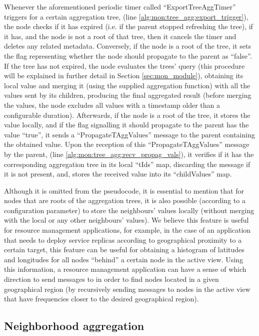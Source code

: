 Whenever the aforementioned periodic timer called ``ExportTreeAggTimer'' triggers for a certain aggregation tree, (line \ref{alg:mon:tree_agg:export_trigger}), the node checks if it has expired (i.e. if the parent stopped refreshing the tree), if it has, and the node is not a root of that tree, then it cancels the timer and deletes any related metadata. Conversely, if the node is a root of the tree, it sets the flag representing whether the node should propagate to the parent as ``false''. If the tree has not expired, the node evaluates the trees' query (this procedure will be explained in further detail in Section \ref{sec:mon_module}), obtaining its local value and merging it (using the supplied aggregation function) with all the values sent by its children, producing the final aggregated result (before merging the values, the node excludes all values with a timestamp older than a configurable duration).  Afterwards, if the node is a root of the tree, it stores the value locally, and if the flag signalling it should propagate to the parent has the value ``true'', it sends a ``PropagateTAggValues'' message to the parent containing the obtained value. Upon the reception of this ``PropagateTAggValues'' message by the parent, (line \ref{alg:mon:tree_agg:recv_propag_vals}), it verifies if it has the corresponding aggregation tree in its local ``tIds'' map, discarding the message if it is not present, and, stores the received value into its ``childValues'' map.

Although it is omitted from the pseudocode, it is essential to mention that for nodes that are roots of the aggregation trees, it is also possible (according to a configuration parameter) to store the neighbours' values locally (without merging with the local or any other neighbours' values). We believe this feature is useful for resource management applications, for example, in the case of an application that needs to deploy service replicas according to geographical proximity to a certain target, this feature can be useful for obtaining a histogram of latitudes and longitudes for all nodes ``behind'' a certain node in the active view. Using this information, a resource management application can have a sense of which direction to send messages to in order to find nodes located in a given geographical region (by recursively sending messages to nodes in the active view that have frequencies closer to the desired geographical region).

\subsection{Neighborhood aggregation} \label{sec:mon_protocol:neigh_agg}

